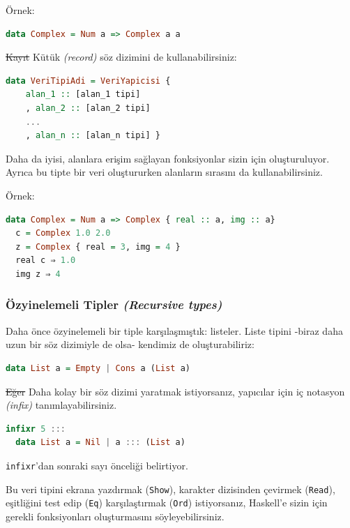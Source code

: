 \documentclass[a4paper,14pt,openany]{extbook} %
\let\emph\textit
\begin{document}
Örnek:

\begin{lstlisting}[language=Haskell]
  data Complex = Num a => Complex a a
\end{lstlisting}

\st{Kayıt} Kütük \emph{(record)} söz dizimini de kullanabilirsiniz:

\begin{lstlisting}[language=Haskell]
  data VeriTipiAdi = VeriYapicisi {
    alan_1 :: [alan_1 tipi]
    , alan_2 :: [alan_2 tipi]
    ...
    , alan_n :: [alan_n tipi] }
\end{lstlisting}

Daha da iyisi, alanlara erişim sağlayan fonksiyonlar sizin için
oluşturuluyor. Ayrıca bu tipte bir veri oluştururken alanların sırasını
da kullanabilirsiniz.

Örnek:

\begin{lstlisting}[language=Haskell]
  data Complex = Num a => Complex { real :: a, img :: a}
  c = Complex 1.0 2.0
  z = Complex { real = 3, img = 4 }
  real c ⇒ 1.0
  img z ⇒ 4
\end{lstlisting}

\subsubsection{\texorpdfstring{Özyinelemeli Tipler
    \emph{(Recursive
      types)}}{3.2.3. Özyinelemeli Tipler (Recursive types)}}\label{uxf6zyinelemeli-tipler-recursive-types}

Daha önce özyinelemeli bir tiple karşılaşmıştık: listeler. Liste tipini
-biraz daha uzun bir söz dizimiyle de olsa- kendimiz de oluşturabiliriz:

\begin{lstlisting}[language=Haskell]
  data List a = Empty | Cons a (List a)
\end{lstlisting}

\st{Eğer} Daha kolay bir söz dizimi yaratmak istiyorsanız, yapıcılar için iç
notasyon \emph{(infix)} tanımlayabilirsiniz.

\begin{lstlisting}[language=Haskell]
  infixr 5 :::
  data List a = Nil | a ::: (List a)
\end{lstlisting}

\lstinline!infixr!'dan sonraki sayı önceliği belirtiyor.

Bu veri tipini ekrana yazdırmak (\lstinline!Show!), karakter
dizisinden çevirmek (\lstinline!Read!), eşitliğini test edip
(\lstinline!Eq!)  karşılaştırmak (\lstinline!Ord!) istiyorsanız,
Haskell'e sizin için gerekli fonksiyonları oluşturmasını
söyleyebilirsiniz.
\end{document}
